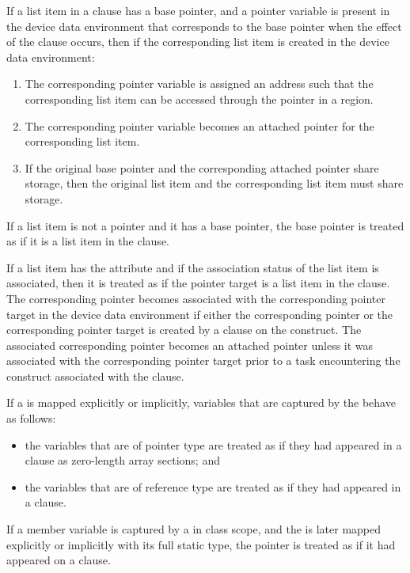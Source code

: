 \begin{ccppspecific}
If a list item in a  clause has a base pointer, and a pointer
variable is present in the device data environment that corresponds to the
base pointer when the effect of the  clause occurs, then if the 
corresponding list item is created in the device data environment: 

\begin{enumerate}
\item The corresponding pointer variable is assigned an address such that the
      corresponding list item can be accessed through the pointer in a 
       region.
\item The corresponding pointer variable becomes an attached pointer
      for the corresponding list item.
\item If the original base pointer and the corresponding attached pointer
      share storage, then the original list item and the corresponding list item 
      must share storage. 
\end{enumerate}
\end{ccppspecific}

\begin{fortranspecific}
If a list item is not a pointer and it has a base pointer, the base
pointer is treated as if it is a list item in the clause.

If a list item has the  attribute and if the association
status of the list item is associated, then it is treated as if the
pointer target is a list item in the clause. The corresponding pointer 
becomes associated with the corresponding pointer target in the device 
data environment if either the corresponding pointer or the corresponding 
pointer target is created by a  clause on the construct. The 
associated corresponding pointer becomes an attached pointer unless it 
was associated with the corresponding pointer target prior to a task 
encountering the construct associated with the  clause.

\end{fortranspecific}

\begin{cppspecific}
If a  is mapped explicitly or implicitly, variables
that are captured by the  behave as follows:

\begin{itemize}
\item the variables that are of pointer type are treated as if they had
      appeared in a  clause as zero-length array sections; and 
\item the variables that are of reference type are treated as if they
      had appeared in a  clause.
\end{itemize}

If a member variable is captured by a  in class scope, and
the  is later mapped explicitly or implicitly with its
full static type, the  pointer is treated as if it had
appeared on a  clause.
\end{cppspecific}


